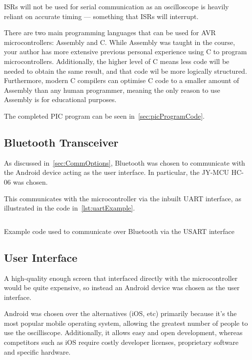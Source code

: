 ISRs will not be used for serial communication as an oscilloscope is heavily
reliant on accurate timing --- something that ISRs will interrupt.

There are two main programming languages that can be used for AVR
microcontrollers: Assembly and C. While Assembly was taught in the course, your
author has more extensive previous personal experience using C to program
microcontrollers. Additionally, the higher level of C means less code will be
needed to obtain the same result, and that code wil be more logically
structured. Furthermore, modern C compilers can optimise C code to a smaller
amount of Assembly than any human programmer, meaning the only reason to use
Assembly is for educational purposes.

The completed PIC program can be seen in~\cref{sec:picProgramCode}.

\subsection{Bluetooth Transceiver}
\label{sec:wireless_transceiver}

As discussed in~\cref{sec:CommOptions}, Bluetooth was chosen to communicate with
the Android device acting as the user interface. In particular, the JY-MCU HC-06
was chosen.

This communicates with the microcontroller via the inbuilt UART interface, as
illustrated in the code in~\cref{lst:uartExample}.

\begin{listing}[H]
  \inputminted{c}{code/USART.c}
  \caption{Example code used to communicate over Bluetooth via the USART
  interface}
  \label{lst:uartExample}
\end{listing}

\subsection{User Interface}
\label{sec:user_interface}

A high-quality enough screen that interfaced directly with the microcontroller
would be quite expensive, so instead an Android device was chosen as the user
interface.

Android was chosen over the alternatives (iOS, etc) primarily because it's the
most popular mobile operating system, allowing the greatest number of people to
use the oscilliscope. Additionally, it allows easy and open development, whereas
competitors such as iOS require costly developer licenses, proprietary software
and specific hardware.

